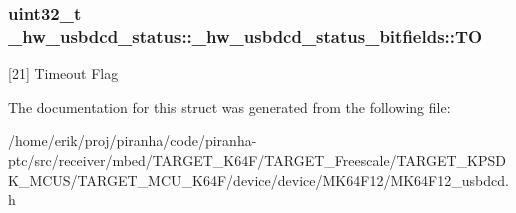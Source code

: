\subsubsection[{\texorpdfstring{TO}{TO}}]{\setlength{\rightskip}{0pt plus 5cm}uint32\+\_\+t \+\_\+hw\+\_\+usbdcd\+\_\+status\+::\+\_\+hw\+\_\+usbdcd\+\_\+status\+\_\+bitfields\+::\+TO}\hypertarget{struct__hw__usbdcd__status_1_1__hw__usbdcd__status__bitfields_ac0cea05f7d306db8ba3e3d32b6db58c7}{}\label{struct__hw__usbdcd__status_1_1__hw__usbdcd__status__bitfields_ac0cea05f7d306db8ba3e3d32b6db58c7}
\mbox{[}21\mbox{]} Timeout Flag 

The documentation for this struct was generated from the following file\+:\begin{DoxyCompactItemize}
\item 
/home/erik/proj/piranha/code/piranha-\/ptc/src/receiver/mbed/\+T\+A\+R\+G\+E\+T\+\_\+\+K64\+F/\+T\+A\+R\+G\+E\+T\+\_\+\+Freescale/\+T\+A\+R\+G\+E\+T\+\_\+\+K\+P\+S\+D\+K\+\_\+\+M\+C\+U\+S/\+T\+A\+R\+G\+E\+T\+\_\+\+M\+C\+U\+\_\+\+K64\+F/device/device/\+M\+K64\+F12/M\+K64\+F12\+\_\+usbdcd.\+h\end{DoxyCompactItemize}
